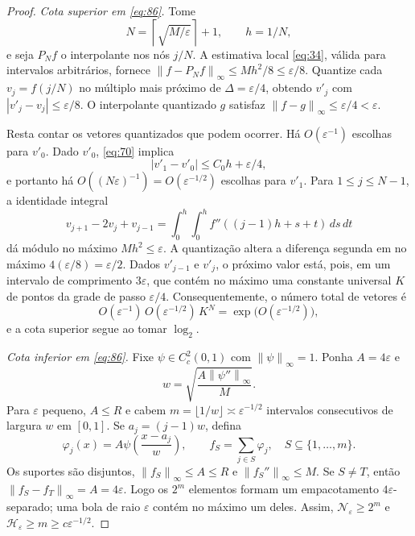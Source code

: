 \documentclass[11pt,a4paper]{article}
\theoremstyle{preciso}
\theoremstyle{definition}
\newcommand{\norm}[1]{\left\|#1\right\|_{\infty}}
\begin{document}
\begin{proof}
\emph{Cota superior em \eqref{eq:86}.} Tome
\[
N=\left\lceil\sqrt{M/\varepsilon}\right\rceil+1,\qquad h=1/N,
\]
e seja $P_Nf$ o interpolante nos nós $j/N$. A estimativa local \eqref{eq:34}, válida para intervalos arbitrários, fornece $\norm{f-P_Nf}\le Mh^2/8\le\varepsilon/8$. Quantize cada $v_j=f(j/N)$ no múltiplo mais próximo de $\Delta=\varepsilon/4$, obtendo $v'_j$ com $|v'_j-v_j|\le\varepsilon/8$. O interpolante quantizado $g$ satisfaz $\norm{f-g}\le\varepsilon/4<\varepsilon$.

Resta contar os vetores quantizados que podem ocorrer. Há $O(\varepsilon^{-1})$ escolhas para $v'_0$. Dado $v'_0$, \eqref{eq:70} implica
\[
|v'_1-v'_0|\le C_0h+\varepsilon/4,
\]
e portanto há $O((N\varepsilon)^{-1})=O(\varepsilon^{-1/2})$ escolhas para $v'_1$. Para $1\le j\le N-1$, a identidade integral
\[
v_{j+1}-2v_j+v_{j-1}=\int_0^h\int_0^h
f''((j-1)h+s+t)\,ds\,dt
\]
dá módulo no máximo $Mh^2\le\varepsilon$. A quantização altera a diferença segunda em no máximo $4(\varepsilon/8)=\varepsilon/2$. Dados $v'_{j-1}$ e $v'_j$, o próximo valor está, pois, em um intervalo de comprimento $3\varepsilon$, que contém no máximo uma constante universal $K$ de pontos da grade de passo $\varepsilon/4$. Consequentemente, o número total de vetores é
\[
O(\varepsilon^{-1})\,O(\varepsilon^{-1/2})\,K^N
=\exp\bigl(O(\varepsilon^{-1/2})\bigr),
\]
e a cota superior segue ao tomar $\log_2$.

\emph{Cota inferior em \eqref{eq:86}.} Fixe $\psi\in C_c^2(0,1)$ com $\norm\psi=1$. Ponha $A=4\varepsilon$ e
\[
w=\sqrt{\frac{A\norm{\psi''}}M}.
\]
Para $\varepsilon$ pequeno, $A\le R$ e cabem $m=\lfloor1/w\rfloor\asymp\varepsilon^{-1/2}$ intervalos consecutivos de largura $w$ em $[0,1]$. Se $a_j=(j-1)w$, defina
\[
\varphi_j(x)=A\psi\left(\frac{x-a_j}w\right),\qquad
f_S=\sum_{j\in S}\varphi_j,\quad S\subseteq\{1,\ldots,m\}.
\]
Os suportes são disjuntos, $\norm{f_S}\le A\le R$ e $\norm{f_S''}\le M$. Se $S\ne T$, então $\norm{f_S-f_T}=A=4\varepsilon$. Logo os $2^m$ elementos formam um empacotamento $4\varepsilon$-separado; uma bola de raio $\varepsilon$ contém no máximo um deles. Assim, $\mathcal N_\varepsilon\ge2^m$ e $\mathcal H_\varepsilon\ge m\ge c\varepsilon^{-1/2}$.


\end{proof}
\end{document}
